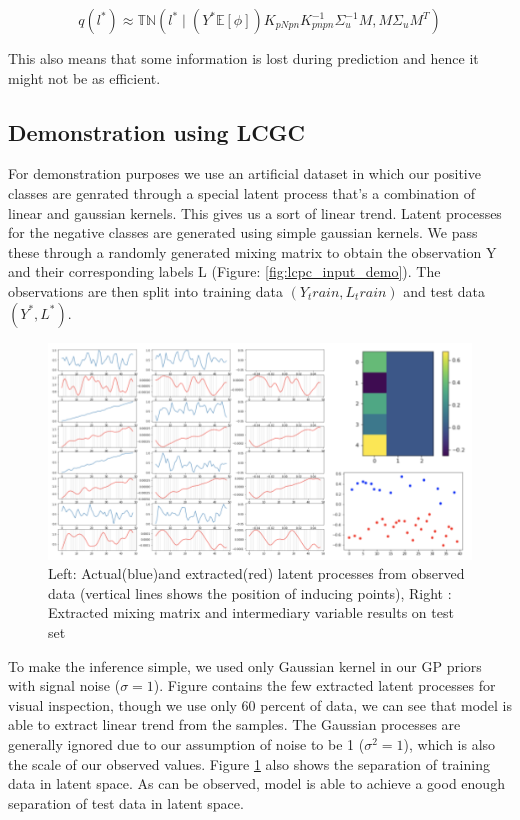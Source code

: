 \begin{equation}
q(l^*) \approx \mathbb{TN}(l^* \mid (Y^*\mathbb{E}[\phi])K_{pNpn}K_{pnpn}^{-1}\Sigma_{u}^{-1}M, M\Sigma_{u}M^T)
\end{equation}

This also means that some information is lost during prediction and hence it might not be as efficient.



\subsection{Demonstration using LCGC}
For demonstration purposes we use an artificial dataset in which our positive classes are genrated through a special latent process that's a combination of linear and gaussian kernels. This gives us a sort of linear trend. Latent processes for the negative classes are generated using simple gaussian kernels. We pass these through a randomly generated mixing matrix to obtain the observation Y and their corresponding labels L (Figure: \ref{fig:lcpc_input_demo}). 
The observations are then split into training data $(Y_train,L_train)$ and test data $(Y^*,L^*)$. 

\begin{figure}
    \centering
    \includegraphics[scale=0.75]{thesis/images/LCGC_output_demo.png}
    \caption{Left: Actual(blue)and extracted(red) latent processes from observed data (vertical lines shows the position of inducing points), Right : Extracted mixing matrix and intermediary variable results on test set}
    \label{fig:lcpc_output_demo}
\end{figure}

To make the inference simple, we used only Gaussian kernel in our GP priors with signal noise ($\sigma = 1$). Figure contains the few extracted latent processes for visual inspection, though we use only $60$ percent of data, we can see that model is able to extract linear trend from the samples. The Gaussian processes are generally ignored due to our assumption of noise to be 1 ($\sigma^2 = 1$), which is also the scale of our observed values. Figure \ref{fig:lcpc_output_demo} also shows the separation of training data in latent space. As can be observed, model is able to achieve a good enough separation of test data in latent space. 















